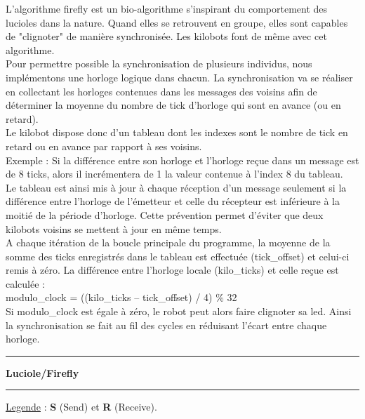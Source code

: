 \documentclass[a4paper,8pt]{report}
\begin{document}
L'algorithme firefly est un bio-algorithme s'inspirant du comportement des lucioles dans la nature. Quand elles se retrouvent en groupe, elles sont capables de "clignoter" de manière synchronis\'ee.
Les kilobots font de même avec cet algorithme.\\

Pour permettre possible la synchronisation de plusieurs individus, nous impl\'ementons une horloge logique dans chacun. La synchronisation va se r\'ealiser en collectant les horloges contenues dans les messages des voisins afin de d\'eterminer la moyenne du nombre de tick d'horloge qui sont en avance (ou en retard).\\

Le kilobot dispose donc d'un tableau dont les indexes sont le nombre de tick en retard ou en avance par rapport à ses voisins.\\
Exemple : Si la diff\'erence entre son horloge et l'horloge reçue dans un message est de 8 ticks, alors il incr\'ementera de 1 la valeur contenue à l'index 8 du tableau.\\
Le tableau est ainsi mis à jour à chaque r\'eception d'un message seulement si la diff\'erence entre l'horloge de l’\'emetteur et celle du r\'ecepteur est inf\'erieure à la moiti\'e de la p\'eriode d'horloge. Cette pr\'evention permet d'\'eviter que deux kilobots voisins se mettent à jour en même temps.\\

A chaque it\'eration de la boucle principale du programme, la moyenne de la somme des ticks enregistr\'es dans le tableau est effectu\'ee (tick\_offset) et celui-ci remis à z\'ero. La diff\'erence entre l'horloge locale (kilo\_ticks) et celle reçue est calcul\'ee :\\

modulo\_clock = ((kilo\_ticks – tick\_offset) / 4) \% 32\\

Si modulo\_clock est \'egale à z\'ero, le robot peut alors faire clignoter sa led. 
Ainsi la synchronisation se fait au fil des cycles en r\'eduisant l'\'ecart entre chaque horloge.

\newpage
\begin{center}
  \rule{\linewidth}{.5pt}
  \textbf{Luciole/Firefly}\\
  \rule{\linewidth}{.5pt}
\end{center}
\underline{Legende} : \textbf{S} (Send) et \textbf{R} (Receive).\\
\end{document}
